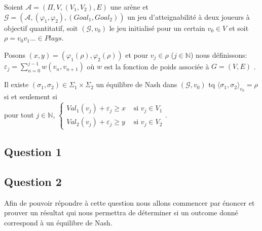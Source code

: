 \begin{propriete}
	\label{prop:outEN2}
	Soient $\mathcal{A} = (\Pi, V, (V_{1}, V_{2}), E)$ une arène et $\mathcal{G} = (\mathcal{A}, (\varphi _{1}, \varphi _{2}), (Goal_{1}, Goal_{2}))$ un jeu d'atteignabilité à deux joueurs à objectif quantitatif, soit $(\mathcal{G}, v_{0})$ le jeu initialisé pour un certain $v_{0} \in V $ et soit $\rho = v_{0}v_{1}... \in Plays$. 
	
	Posons $(x,y) = (\varphi _{1}(\rho), \varphi _{2}(\rho))$ et pour $v_{j} \in \rho$ ($j \in \mathbb{N}$) nous définissons: $\varepsilon _{j} = \sum _{n= 0} ^{j-1} w(v_{n},v_{n+1})$ où $w$ est la fonction de poids associée à $G = (V,E)$ .
	
	\begin{center}Il existe $(\sigma _{1},\sigma _{2}) \in \Sigma _{1} \times \Sigma _{2}$ un équilibre de Nash dans $(\mathcal{G},v_{0})$ tq $\langle \sigma _{1},\sigma _{2}\rangle_{v_0} = \rho$\\ $\text{}$\\ si et seulement si\\$\text{}$\\ pour tout $j \in \mathbb{N}$, $\begin{cases}
													Val_{1}(v_{j}) + \varepsilon _{j} \geq x & \text{ si } v_{j} \in V_{1} \\
													Val_{2}(v_{j}) + \varepsilon _{j} \geq y & \text{ si } v_{j} \in V_{2} 
													\end{cases}$.\end{center}  
\end{propriete}
	
\subsection{Question 1}
\subsection{Question 2}
Afin de pouvoir répondre à cette question nous allons commencer par énoncer et prouver un résultat qui nous permettra de déterminer si un outcome donné correspond à un équilibre de Nash.

